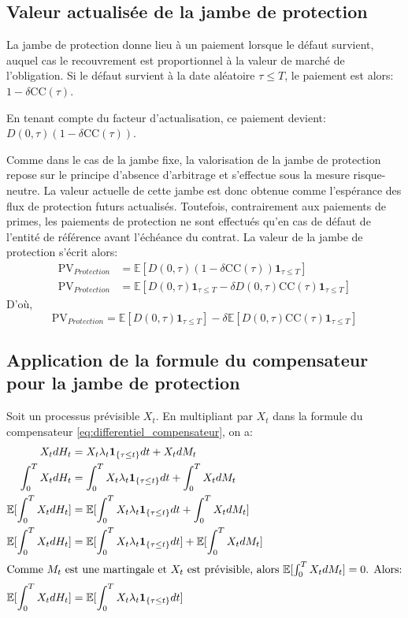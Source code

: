 \subsection{Valeur actualisée de la jambe de protection}

 La jambe de protection donne lieu à un paiement lorsque le défaut survient, auquel cas le recouvrement est proportionnel à la valeur de marché de l'obligation. Si le défaut survient à la date aléatoire $\tau \le T$, le paiement est alors: $1 - \delta \mathrm{CC}(\tau)$.

 En tenant compte du facteur d'actualisation, ce paiement devient: $D(0, \tau)(1 - \delta \mathrm{CC}(\tau))$.

Comme dans le cas de la jambe fixe, la valorisation de la jambe de protection repose sur le principe d'absence d'arbitrage et s'effectue sous la mesure risque-neutre. La valeur actuelle de cette jambe est donc obtenue comme l'espérance des flux de protection futurs actualisés. Toutefois, contrairement aux paiements de primes, les paiements de protection ne sont effectués qu'en cas de défaut de l'entité de référence avant l'échéance du contrat. La valeur de la jambe de protection s'écrit alors:
\begin{align*}
    \mathrm{PV}_{Protection} &= \mathbb{E} [D(0, \tau) (1 - \delta \mathrm{CC}(\tau)) \mathbf{1}_{\tau \le T}] \\
    \mathrm{PV}_{Protection} &= \mathbb{E} [D(0, \tau) \mathbf{1}_{\tau \le T} - \delta D(0, \tau) \mathrm{CC}(\tau) \mathbf{1}_{\tau \le T}]
\end{align*}
D'où,
\begin{equation}
    \mathrm{PV}_{Protection} = \mathbb{E} [D(0, \tau) \mathbf{1}_{\tau \le T}] - \delta \mathbb{E}[D(0, \tau) \mathrm{CC}(\tau) \mathbf{1}_{\tau \le T}]
    \label{eq:jambe_protection_actuel}
\end{equation}


\subsection{Application de la formule du compensateur pour la jambe de protection}

Soit un processus prévisible $X_t$. En multipliant par $X_t$ dans la formule du compensateur \ref{eq:differentiel_compensateur}, on a:
\begin{align*}
    X_t dH_t &= X_t \lambda_t \mathbf{1}_{\{\tau \le t\}}dt + X_t dM_t \\
    \int_0^T X_t dH_t &= \int_0^T X_t \lambda_t \mathbf{1}_{\{\tau \le t\}} dt + \int_0^T X_t dM_t \\
    \mathbb{E}[\int_0^T X_t dH_t] &= \mathbb{E}[\int_0^T X_t \lambda_t \mathbf{1}_{\{\tau \le t\}} dt + \int_0^T X_t dM_t] \\
    \mathbb{E}[\int_0^T X_t dH_t] &= \mathbb{E}[\int_0^T X_t \lambda_t \mathbf{1}_{\{\tau \le t\}} dt] + \mathbb{E}[\int_0^T X_t dM_t] \\
    \intertext{Comme $M_t$ est une martingale et $X_t$ est prévisible, alors $\mathbb{E}[\int_0^T X_t dM_t] = 0$. Alors:}
    \mathbb{E}[\int_0^T X_t dH_t] &= \mathbb{E}[\int_0^T X_t \lambda_t \mathbf{1}_{\{\tau \le t\}} dt]
\end{align*}

